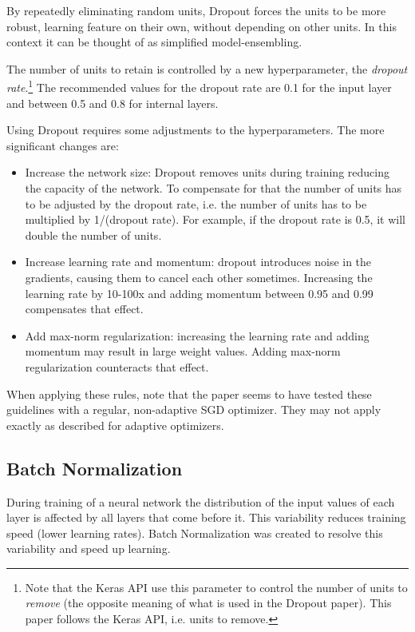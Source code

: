 \documentclass[../CAP6619_term_project_cgarbin.tex]{subfiles}
\begin{document}
By repeatedly eliminating random units, Dropout forces the units to be more robust, learning feature on their own, without depending on other units. In this context it can be thought of as simplified model-ensembling.

The number of units to retain is controlled by a new hyperparameter, the \textit{dropout rate}.\footnote{Note that the Keras API use this parameter to control the number of units to \textit{remove} (the opposite meaning of what is used in the Dropout paper). This paper follows the Keras API, i.e. units to remove.} The recommended values for the dropout rate are 0.1 for the input layer and between 0.5 and 0.8 for internal layers.

Using Dropout requires some adjustments to the hyperparameters. The more significant changes are:

\begin{itemize}
\item Increase the network size: Dropout removes units during training reducing the capacity of the network. To compensate for that the number of units has to be adjusted by the dropout rate, i.e. the number of units has to be multiplied by 1/(dropout rate). For example, if the dropout rate is 0.5, it will double the number of units.
\item Increase learning rate and momentum: dropout introduces noise in the gradients, causing them to cancel each other sometimes. Increasing the learning rate by 10-100x and adding momentum between 0.95 and 0.99 compensates that effect.
\item Add max-norm regularization: increasing the learning rate and adding momentum may result in large weight values. Adding max-norm regularization counteracts that effect.
\end{itemize}

When applying these rules, note that the paper seems to have tested these guidelines with a regular, non-adaptive SGD optimizer. They may not apply exactly as described for adaptive optimizers.

\subsection{Batch Normalization}

During training of a neural network the distribution of the input values of each layer is affected by all layers that come before it. This variability reduces training speed (lower learning rates). Batch Normalization \cite{Ioffe2015} was created to resolve this variability and speed up learning.
\end{document}
